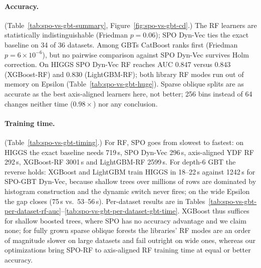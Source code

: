 \paragraph{Accuracy.}
(Table~\ref{tab:spo-vs-gbt-summary}, Figure~\ref{fig:spo-vs-gbt-cd}.) The RF learners are
statistically indistinguishable (Friedman $p=0.06$); SPO Dyn-Vec ties the exact baseline on 34
of 36 datasets. Among GBTs CatBoost ranks first (Friedman $p=6\times10^{-6}$), but no pairwise
comparison against SPO Dyn-Vec survives Holm correction. On HIGGS SPO Dyn-Vec RF reaches AUC
0.847 versus 0.843 (XGBoost-RF) and 0.830 (LightGBM-RF); both library RF modes run out of
memory on Epsilon (Table~\ref{tab:spo-vs-gbt-huge}). Sparse oblique splits are as accurate as
the best axis-aligned learners here, not better; 256 bins instead of 64 changes neither time
($0.98\times$) nor any conclusion.



\paragraph{Training time.}
(Table~\ref{tab:spo-vs-gbt-timing}.) For RF, SPO goes from slowest to fastest: on HIGGS the
exact baseline needs 719\,s, SPO Dyn-Vec 296\,s, axis-aligned YDF RF 292\,s, XGBoost-RF
3001\,s and LightGBM-RF 2599\,s. For depth-6 GBT the reverse holds: XGBoost and LightGBM train
HIGGS in 18--22\,s against 1242\,s for SPO-GBT Dyn-Vec, because shallow trees over millions of
rows are dominated by histogram construction and the dynamic switch never fires; on the wide
Epsilon the gap closes (75\,s vs.\ 53--56\,s). Per-dataset results are in
Tables~\ref{tab:spo-vs-gbt-per-dataset-rf-auc}--\ref{tab:spo-vs-gbt-per-dataset-gbt-time}.
XGBoost thus suffices for shallow boosted trees, where SPO has no accuracy advantage and we
claim none; for fully grown sparse oblique forests the libraries' RF modes are an order of
magnitude slower on large datasets and fail outright on wide ones, whereas our optimizations
bring SPO-RF to axis-aligned RF training time at equal or better accuracy.


